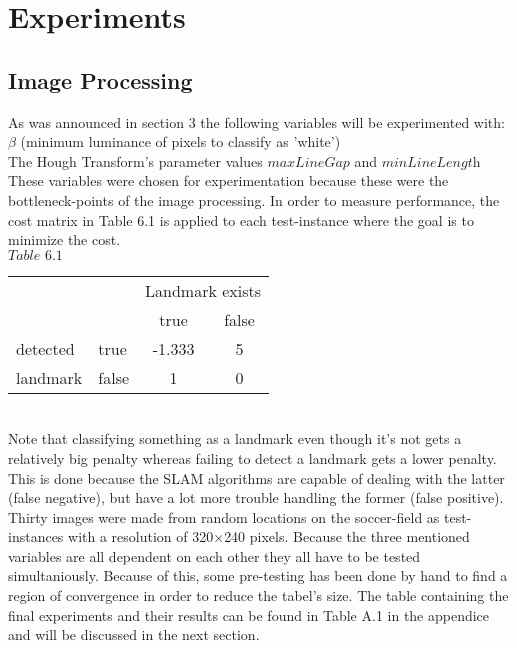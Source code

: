 \documentclass{ba-kecs}
\numberwithin{figure}{section}
\numberwithin{equation}{section}
\begin{document}

\section{Experiments}

\subsection{Image Processing}
As was announced in section 3 the following variables will be experimented with: \\
$\beta$ (minimum luminance of pixels to classify as 'white')\\
The Hough Transform's parameter values $\textit{maxLineGap}$ and $\textit{minLineLength}$ \\
These variables were chosen for experimentation because these were the bottleneck-points of the image processing. 
In order to measure performance, the cost matrix in Table 6.1 is applied to each test-instance where the goal is to minimize the cost. \\

	$\textit{Table 6.1}$ \\
\begin{tabular}{ l l|c|c| }
\multicolumn{1}{r}{} & \multicolumn{1}{r}{} & \multicolumn{2}{c}{Landmark exists} \\
\multicolumn{1}{r}{} & \multicolumn{1}{r}{}
 &  \multicolumn{1}{c}{{\small true}}
 & \multicolumn{1}{c}{{\small false}} \\
\cline{3-4}
detected & {\small true} & -1.333 & 5 \\
\cline{3-4}
landmark & {\small false} & 1 & 0 \\
\cline{3-4}
\end{tabular} \\


Note that classifying something as a landmark even though it's not gets a relatively big penalty whereas failing to detect a landmark gets a lower penalty. This is done because the SLAM algorithms are capable of dealing with the latter (false negative), but have a lot more trouble handling the former (false positive). \\
Thirty images were made from random locations on the soccer-field as test-instances with a resolution of 320$\times$240 pixels.
Because the three mentioned variables are all dependent on each other they all have to be tested simultaniously. Because of this, some pre-testing has been done by hand to find a region of convergence in order to reduce the tabel's size. The table containing the final experiments and their results can be found in Table A.1 in the appendice and will be discussed in the next section.
\end{document}
